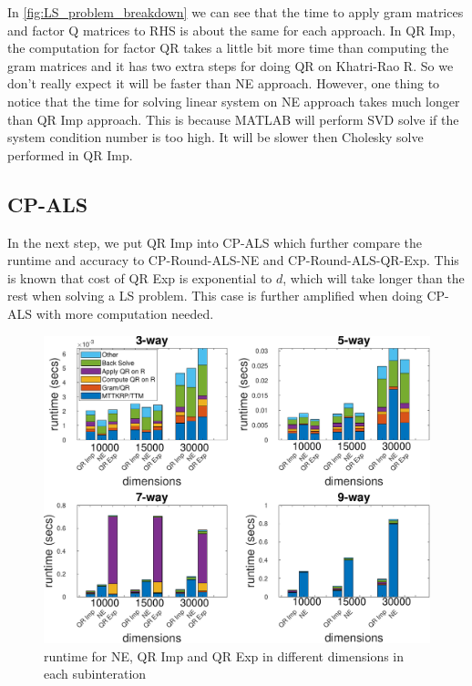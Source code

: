 \documentclass{article}
\begin{document}
In \cref{fig:LS_problem_breakdown} we can see that the time to apply gram matrices and factor Q matrices to RHS is about the same for each approach.
In QR Imp, the computation for factor QR takes a little bit more time than computing the gram matrices and it has two extra steps for doing QR on Khatri-Rao R.
So we don't really expect it will be faster than NE approach. 
However, one thing to notice that the time for solving linear system on NE approach takes much longer than QR Imp approach.
This is because MATLAB will perform SVD solve if the system condition number is too high.
It will be slower then Cholesky solve performed in QR Imp.

\subsection{CP-ALS}

In the next step, we put QR Imp into CP-ALS which further compare the runtime and accuracy to CP-Round-ALS-NE and CP-Round-ALS-QR-Exp. 
This is known that cost of QR Exp is exponential to $d$, which will take longer than the rest when solving a LS problem.
This case is further amplified when doing CP-ALS with more computation needed.
\begin{figure}[ht!]
  \begin{center}
    \includegraphics[scale = 0.7]{Fig_kt.pdf}
    \caption[Figure]{runtime for NE, QR Imp and QR Exp in different dimensions in each subinteration \label{fig:runtime}}
  \end{center}
\end{figure}
\end{document}
